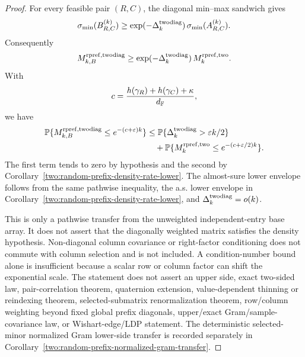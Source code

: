 \begin{proof}
For every feasible pair \((R,C)\), the diagonal min--max sandwich gives
\[
  \sigma_{\min}(B_{R,C}^{(k)})
  \ge
  \exp(-\Delta_k^{\rm twodiag})\,\sigma_{\min}(A_{R,C}^{(k)}).
\]
Consequently
\[
  M_{k,B}^{\rm rpref,twodiag}
  \ge
  \exp(-\Delta_k^{\rm twodiag})\,M_k^{\rm rpref,two}.
\]
With
\[
  c=\frac{h(\gamma_R)+h(\gamma_C)+\kappa}{d_{\mathbb{F}}},
\]
we have
\[
\begin{aligned}
  \mathbb{P}\{M_{k,B}^{\rm rpref,twodiag}\le e^{-(c+\varepsilon)k}\}
  &\le
  \mathbb{P}\{\Delta_k^{\rm twodiag}>\varepsilon k/2\}  \\
  &\quad+
  \mathbb{P}\{M_k^{\rm rpref,two}\le e^{-(c+\varepsilon/2)k}\}.
\end{aligned}
\]
The first term tends to zero by hypothesis and the second by
Corollary~\ref{two:random-prefix-density-rate-lower}.  The almost-sure lower
envelope follows from the same pathwise inequality, the a.s. lower envelope in
Corollary~\ref{two:random-prefix-density-rate-lower}, and
\(\Delta_k^{\rm twodiag}=o(k)\).

This is only a pathwise transfer from the unweighted independent-entry base
array.  It does not assert that the diagonally weighted matrix satisfies the
density hypothesis.  Non-diagonal column covariance or right-factor
conditioning does not commute with column selection and is not included.  A
condition-number bound alone is insufficient because a scalar row or column
factor can shift the exponential scale.  The statement does not assert an upper
side, exact two-sided law, pair-correlation theorem, quaternion extension,
value-dependent thinning or reindexing theorem, selected-submatrix
renormalization theorem, row/column weighting beyond fixed global prefix
diagonals, upper/exact Gram/sample-covariance law, or Wishart-edge/LDP
statement.  The deterministic selected-minor normalized Gram lower-side
transfer is recorded separately in
Corollary~\ref{two:random-prefix-normalized-gram-transfer}.
\end{proof}

